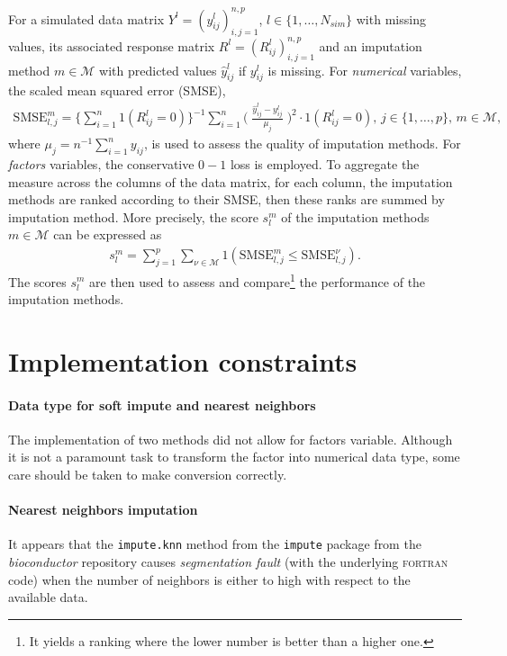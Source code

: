 For a simulated data matrix $Y^l = (y^l_{ij})_{i,j=1}^{n,p}$,
$l \in \{1, \dots, N_{sim}\}$ with missing values, its associated response
matrix $R^l = (R_{ij}^l)_{i,j=1}^{n, p}$ and an imputation method
$m \in \mathcal{M}$ with predicted values $\hat y^l_{ij}$ if $y^l_{ij}$ is
missing. For \emph{numerical} variables, the scaled mean squared error (SMSE),
\begin{align}\label{eq:smse}
  \textrm{SMSE}^{m}_{l,j} = \Big\{\sum_{i=1}^n 1(R^l_{ij}=0)\Big\}^{-1} \sum_{i=1}^{n} \Big(\;\frac{\hat y_{ij}^l - y^l_{ij}}{\mu_j}\;\Big)^2 \cdot 1(R^l_{ij}=0),
  \, j \in \{1, \dots, p\}, \, m \in \mathcal{M},
\end{align}
where $\mu_j = n^{-1}\sum_{i=1}^n y_{ij}$, is used to assess the quality of
imputation methods. For \emph{factors} variables, the conservative $0-1$ loss
is employed. To aggregate the measure across the columns of the data matrix,
for each column, the imputation methods are ranked according to their SMSE,
then these ranks are summed by imputation method. More precisely, the score
$s^m_l$ of the imputation methods $m \in \mathcal{M}$ can be expressed as
\begin{align} \label{eq:score:imputation}
  s^{m}_{l} = \sum_{j=1}^p \sum_{\nu \in \mathcal{M}} 1(\textrm{SMSE}^{m}_{l,j} \leq \textrm{SMSE}^{\nu}_{l,j}).
\end{align}
The scores $s^m_l$ are then used to assess and compare\footnote{It yields a
  ranking where the lower number is better than a higher one.} the performance
of the imputation methods.

\section{Implementation constraints}

\paragraph{Data type for soft impute and nearest neighbors}
The implementation of two methods did not allow for factors variable. Although
it is not a paramount task to transform the factor into numerical data type,
some care should be taken to make conversion correctly.

\paragraph{Nearest neighbors imputation}
It appears that the \texttt{impute.knn} method from the \texttt{impute} package
from the \emph{bioconductor} repository causes \emph{segmentation fault} (with
the underlying \textsc{fortran} code) when the number of neighbors is either to
high with respect to the available data.


